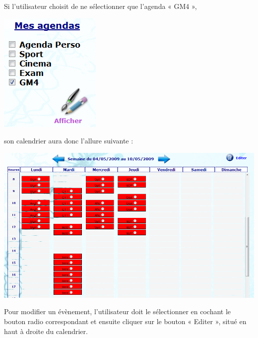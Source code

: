 \documentclass[12pt , a4paper]{article}
\begin{document}
\noindent Si l’utilisateur choisit de ne sélectionner que l’agenda « GM4 »,
\begin{center}
  \includegraphics[scale=0.6]{./images/calendrier_agenda3.png}
\end{center}
\noindent son calendrier aura donc l’allure suivante :
\begin{center}
  \includegraphics[scale=0.6]{./images/calendrier_agenda2.png}
\end{center}



\noindent Pour modifier un évènement, l’utilisateur doit le sélectionner en cochant le bouton radio
correspondant et ensuite cliquer sur le bouton « Editer », situé en haut à droite du calendrier.
\end{document}
